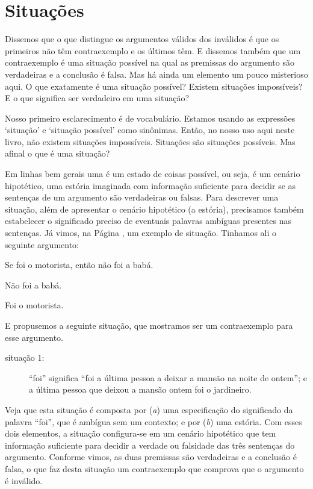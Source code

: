 \section{Situações}
\label{ss:Validade}
Dissemos que o que distingue os argumentos válidos dos inválidos é que os primeiros não têm contraexemplo e os últimos têm.
E dissemos também que um contraexemplo é uma situação possível na qual as premissas do argumento são verdadeiras e a conclusão é falsa. 
Mas há ainda um elemento um pouco misterioso aqui.
O que exatamente é uma situação possível?
Existem situações impossíveis?
E o que significa ser verdadeiro em uma situação?

Nosso primeiro esclarecimento é de vocabulário.
Estamos usando as expressões `situação' e `situação possível' como sinônimas.
Então, no nosso uso aqui neste livro, não existem situações impossíveis.
Situações são situações possíveis.
Mas afinal o que é uma situação?

Em linhas bem gerais uma  é um estado de coisas possível, ou seja, é um cenário hipotético, uma estória imaginada com informação suficiente para decidir se as sentenças de um argumento são verdadeiras ou falsas.
Para descrever uma situação, além de apresentar o cenário hipotético (a estória), precisamos também estabelecer o significado preciso de eventuais palavras ambíguas presentes nas sentenças.
Já vimos, na Página \pageref{argMaidDriver}, um exemplo de situação. %
Tinhamos ali o seguinte argumento:
 
 \begin{earg}
 	\item[] Se foi o motorista, então não foi a babá.
 	\item[] Não foi a babá.
 	\item[\therefore] Foi o motorista.
 \end{earg}
E propusemos a seguinte situação, que mostramos ser um contraexemplo para esse argumento.

\begin{description}
	\item[situação 1:] ``foi'' significa ``foi a última pessoa a deixar a mansão na noite de ontem''; e a última pessoa que deixou a mansão ontem foi o jardineiro.
\end {description}
Veja que esta situação é composta por (\textit{a}) uma especificação do significado da palavra ``foi'', que é ambígua sem um contexto; e por (\textit{b}) uma estória.
Com esses dois elementos, a situação configura-se em um cenário hipotético que tem informação suficiente para decidir a verdade ou falsidade das três sentenças do argumento.
Conforme vimos, as duas premissas são verdadeiras e a conclusão é falsa, o que faz desta situação um contraexemplo que comprova que o argumento é inválido.


